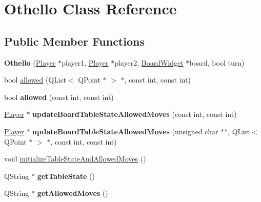 \hypertarget{classOthello}{
\section{Othello Class Reference}
\label{classOthello}
}
\subsection*{Public Member Functions}
\begin{DoxyCompactItemize}
\item 
\hypertarget{classOthello_aedd3d416bbfd63c5db02bd9748bd0eff}{
{\bfseries Othello} (\hyperlink{classPlayer}{Player} $\ast$player1, \hyperlink{classPlayer}{Player} $\ast$player2, \hyperlink{classBoardWidget}{BoardWidget} $\ast$board, bool turn)}
\label{classOthello_aedd3d416bbfd63c5db02bd9748bd0eff}

\item 
bool \hyperlink{classOthello_a8c09fac5f811de871610e29584f39223}{allowed} (QList$<$ QPoint $\ast$ $>$ $\ast$, const int, const int)
\item 
\hypertarget{classOthello_a485c11d91525c34f77c9c8fae3024466}{
bool {\bfseries allowed} (const int, const int)}
\label{classOthello_a485c11d91525c34f77c9c8fae3024466}

\item 
\hypertarget{classOthello_a28b82c8db09cfaed9744f144c3ea2faa}{
\hyperlink{classPlayer}{Player} $\ast$ {\bfseries updateBoardTableStateAllowedMoves} (const int, const int)}
\label{classOthello_a28b82c8db09cfaed9744f144c3ea2faa}

\item 
\hypertarget{classOthello_a1eb54150dd32e72b0c43b45eecf9b444}{
\hyperlink{classPlayer}{Player} $\ast$ {\bfseries updateBoardTableStateAllowedMoves} (unsigned char $\ast$$\ast$, QList$<$ QPoint $\ast$ $>$ $\ast$, const int, const int)}
\label{classOthello_a1eb54150dd32e72b0c43b45eecf9b444}

\item 
void \hyperlink{classOthello_a1a62eecf0fdeb78c42ff01b4c2029b36}{initializeTableStateAndAllowedMoves} ()
\item 
\hypertarget{classOthello_a8f5486f0883f756bbbbe109c76260754}{
QString $\ast$ {\bfseries getTableState} ()}
\label{classOthello_a8f5486f0883f756bbbbe109c76260754}

\item 
\hypertarget{classOthello_a67b6d2582958b5f25d9e3543f0bc57ff}{
QString $\ast$ {\bfseries getAllowedMoves} ()}
\label{classOthello_a67b6d2582958b5f25d9e3543f0bc57ff}


\end{DoxyCompactItemize}
